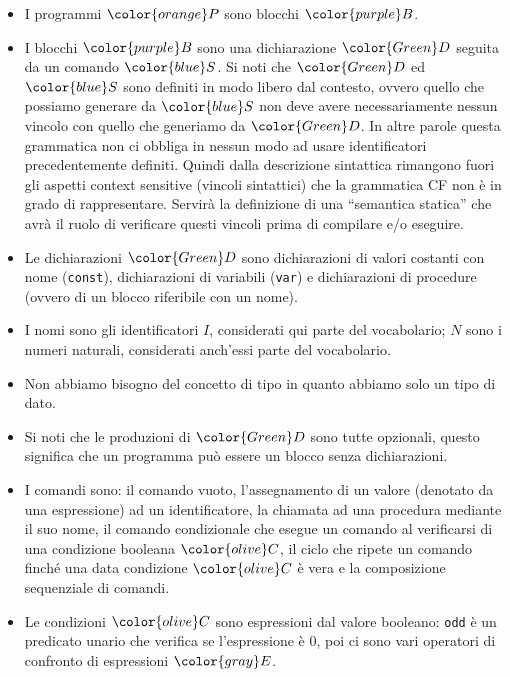 \documentclass[a4paper]{article}
\begin{document}
\begin{itemize}
  \item I programmi \( \color{orange}P \) sono blocchi \( \color{purple}B \).
  \item I blocchi \( \color{purple}B \) sono una dichiarazione \( \color{Green}D \)
    seguita da un comando \( \color{blue}S \).
    Si noti che \( \color{Green}D \) ed \( \color{blue}S \) sono definiti in modo
    libero dal contesto, ovvero quello che possiamo generare da \( \color{blue}S \)
    non deve avere necessariamente nessun vincolo con quello che generiamo da
    \( \color{Green}D \). In altre parole questa grammatica non ci obbliga in nessun
    modo ad usare identificatori precedentemente definiti. Quindi dalla descrizione
    sintattica rimangono fuori gli aspetti context sensitive (vincoli sintattici)
    che la grammatica CF non è in grado di rappresentare. Servirà la definizione di
    una “semantica statica” che avrà il ruolo di verificare questi vincoli prima di
    compilare e/o eseguire.

  \item Le dichiarazioni \( \color{Green}D \) sono dichiarazioni di valori costanti
    con nome (\texttt{const}), dichiarazioni di variabili (\texttt{var}) e
    dichiarazioni di procedure (ovvero di un blocco riferibile con un nome).

  \item I nomi sono gli identificatori \( I \), considerati qui parte del vocabolario;
    \( N \) sono i numeri naturali, considerati anch’essi parte del vocabolario.

  \item Non abbiamo bisogno del concetto di tipo in quanto abbiamo solo un tipo di dato.

  \item Si noti che le produzioni di \( \color{Green}D \) sono tutte opzionali, questo
    significa che un programma può essere un blocco senza dichiarazioni.

  \item I comandi sono: il comando vuoto, l’assegnamento di un valore (denotato da una
    espressione) ad un identificatore, la chiamata ad una procedura mediante il suo
    nome, il comando condizionale che esegue un comando al verificarsi di una
    condizione booleana \( \color{olive}C \), il ciclo che ripete un comando finché una data
    condizione \( \color{olive}C \) è vera e la composizione sequenziale di comandi.

  \item Le condizioni \( \color{olive}C \) sono espressioni dal valore booleano:
    \texttt{odd} è un predicato unario che verifica se l’espressione è
    0, poi ci sono vari operatori di confronto di espressioni \( \color{gray}E \).


\end{itemize}
\end{document}
